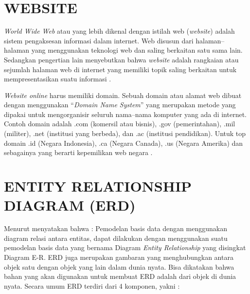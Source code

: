 \section{\uppercase{WEBSITE}}
\textit{World Wide Web} atau yang lebih dikenal dengan istilah web (\textit{website}) adalah sistem pengaksesan informasi dalam internet. Web disusun dari halaman–halaman yang menggunakan teknologi web dan saling berkaitan satu sama lain. Sedangkan pengertian lain menyebutkan bahwa \textit{website} adalah rangkaian atau sejumlah halaman web di internet yang memiliki topik saling berkaitan untuk mempresentasikan suatu informasi \citep{ginanjar2014rahasia}.

\par \textit{Website online} harus memiliki domain. Sebuah domain atau alamat web dibuat dengan menggunakan “\textit{Domain Name System}” yang merupakan metode yang dipakai untuk mengorganisir seluruh nama–nama komputer yang ada di internet. Contoh domain adalah .com (komersil atau bisnis), .gov (pemerintahan), .mil (militer), .net (institusi yang berbeda), dan .ac (institusi pendidikan). Untuk top domain .id (Negara Indonesia), .ca (Negara Canada), .us (Negara Amerika) dan sebagainya yang berarti kepemilikan web negara \citep{dhika2015perancangan}.

\section{\uppercase{ENTITY RELATIONSHIP DIAGRAM (ERD)}}
Menurut \citep{priyadi2014} menyatakan bahwa : Pemodelan basis data dengan menggunakan diagram relasi antara entitas, dapat dilakukan dengan menggunakan suatu pemodelan basis data yang bernama Diagram \textit{Entity Relationship} yang disingkat Diagram E-R. ERD juga merupakan gambaran yang menghubungkan antara objek satu dengan objek yang lain dalam dunia nyata. Bisa dikatakan bahwa bahan yang akan digunakan untuk membuat ERD adalah dari objek di dunia nyata. Secara umum ERD terdiri dari 4 komponen, yakni :

